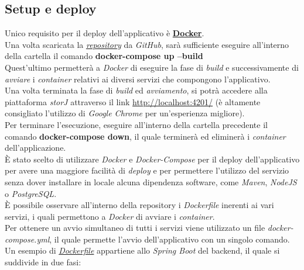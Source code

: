 \documentclass{article}
\begin{document}
\subsection*{Setup e deploy}
Unico requisito per il deploy dell'applicativo è \href{https://www.docker.com/get-started/}{\textbf{Docker}}. \\
Una volta scaricata la \href{https://github.com/DavideDeRosa/storJ_SWE}{\textit{repository}} da \textit{GitHub}, sarà sufficiente eseguire all'interno della cartella il comando \textbf{docker-compose up --build}\\
Quest'ultimo permetterà a \textit{Docker} di eseguire la fase di \textit{build} e successivamente di \textit{avviare} i \textit{container} relativi ai diversi servizi che compongono l'applicativo.\vspace*{7pt}\\
Una volta terminata la fase di \textit{build} ed \textit{avviamento}, si potrà accedere alla piattaforma \textit{storJ} attraverso il link \href{http://localhost:4201/}{http://localhost:4201/} (è altamente consigliato l’utilizzo di \textit{Google Chrome} per un’esperienza migliore).\vspace*{7pt}\\
Per terminare l'esecuzione, eseguire all'interno della cartella precedente il comando \textbf{docker-compose down}, il quale terminerà ed eliminerà i \textit{container} dell'applicazione.\vspace*{7pt}\\
È stato scelto di utilizzare \textit{Docker} e \textit{Docker-Compose} per il deploy dell'applicativo per avere una maggiore facilità di \textit{deploy} e per permettere l'utilizzo del servizio senza dover installare in locale alcuna dipendenza software, come \textit{Maven}, \textit{NodeJS} o \textit{PostgreSQL}.\vspace*{7pt}\\
È possibile osservare all'interno della repository i \textit{Dockerfile} inerenti ai vari servizi, i quali permettono a \textit{Docker} di avviare i \textit{container}.\\
Per ottenere un avvio simultaneo di tutti i servizi viene utilizzato un file \textit{docker-compose.yml}, il quale permette l'avvio dell'applicativo con un singolo comando.\vspace*{7pt}\\
Un esempio di \href{https://github.com/DavideDeRosa/storJ_SWE/blob/develop/backend/Dockerfile}{\textit{Dockerfile}} appartiene allo \textit{Spring Boot} del backend, il quale si suddivide in due fasi:
\end{document}
